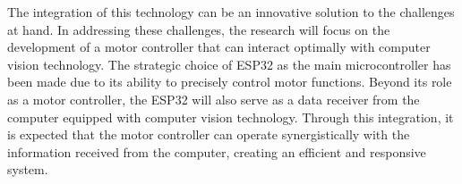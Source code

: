 The integration of this technology can be an innovative solution to the challenges at hand. In addressing these challenges, the research will focus on the development of a motor controller that can interact optimally with computer vision technology. The strategic choice of ESP32 as the main microcontroller has been made due to its ability to precisely control motor functions. Beyond its role as a motor controller, the ESP32 will also serve as a data receiver from the computer equipped with computer vision technology. Through this integration, it is expected that the motor controller can operate synergistically with the information received from the computer, creating an efficient and responsive system.
